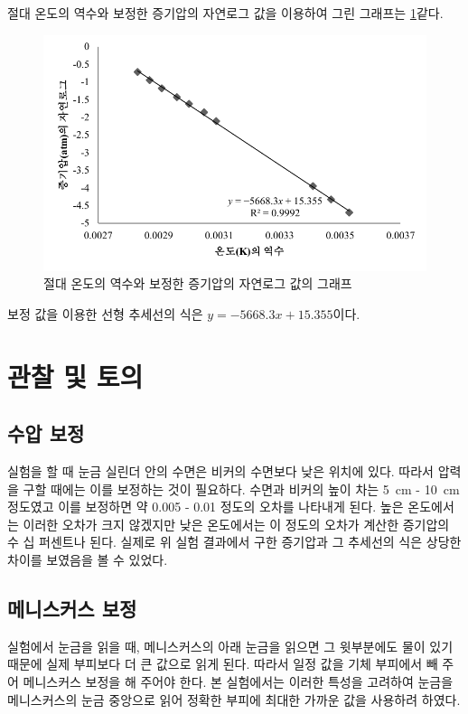 \documentclass[a4paper,10pt]{article}
\begin{document}
	절대 온도의 역수와 보정한 증기압의 자연로그 값을 이용하여 그린 그래프는 \ref{exp_graph_2}\과 같다.
	
	\begin{figure}[ht]
		\centering
		\includegraphics[scale=1]{Book3_2.pdf}
		\caption{절대 온도의 역수와 보정한 증기압의 자연로그 값의 그래프}
		\label{exp_graph_2}
	\end{figure}
	
	보정 값을 이용한 선형 추세선의 식은 $y = -5668.3x + 15.355$이다.
	
	\section{관찰 및 토의}
	
	\subsection{수압 보정}
	실험을 할 때 눈금 실린더 안의 수면은 비커의 수면보다 낮은 위치에 있다. 따라서 압력을 구할 때에는 이를 보정하는 것이 필요하다. 수면과 비커의 높이 차는 \SI{5}{\centi\metre} - \SI{10}{\centi\metre} 정도였고 이를 보정하면 약 \SI{0.005}{\atmosphere} - \SI{0.01}{\atmosphere} 정도의 오차를 나타내게 된다. 높은 온도에서는 이러한 오차가 크지 않겠지만 낮은 온도에서는 이 정도의 오차가 계산한 증기압의 수 십 퍼센트나 된다. 실제로 위 실험 결과에서 구한 증기압과 그 추세선의 식은 상당한 차이를 보였음을 볼 수 있었다.
	
	\subsection{메니스커스 보정}
	실험에서 눈금을 읽을 때, 메니스커스의 아래 눈금을 읽으면 그 윗부분에도 물이 있기 때문에 실제 부피보다 더 큰 값으로 읽게 된다. 따라서 일정 값을 기체 부피에서 빼 주어 메니스커스 보정을 해 주어야 한다. 본 실험에서는 이러한 특성을 고려하여 눈금을 메니스커스의 눈금 중앙으로 읽어 정확한 부피에 최대한 가까운 값을 사용하려 하였다.
	
\end{document}
